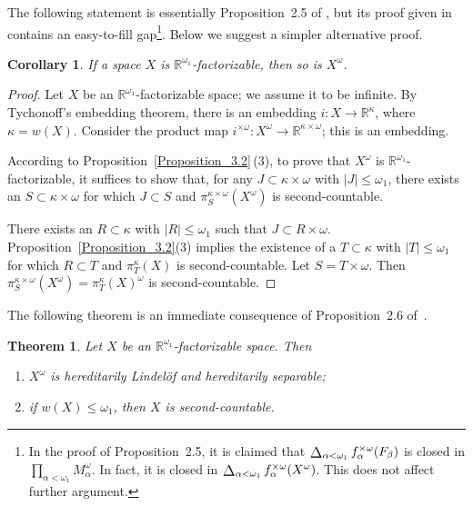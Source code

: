 \documentclass[a4paper,12pt]{amsart}
\newtheorem{theorem}{Theorem}[section]
\newtheorem{corollary}{Corollary}[section]
\theoremstyle{definition}
\theoremstyle{remark}
\def\bigdiag{\operatornamewithlimits{%
  \mathchoice{\vcenter{\hbox{\Large$\Delta$}}}
             {\vcenter{\hbox{\large$\Delta$}}}
             {\Delta}
             {\Delta}}}
\begin{document}
The following statement is essentially Proposition~2.5 of \cite{R-S_2025}, but its proof given in 
\cite{R-S_2025} contains an easy-to-fill gap\footnote{In the proof of Proposition~2.5, it is claimed that 
$\bigdiag_{\alpha<\omega_1}f_\alpha^{\times\omega}(F_\beta)$ is closed in 
$\prod_{\alpha<\omega_1}M_\alpha^\omega$. In fact, 
it is closed in $\bigdiag_{\alpha<\omega_1}f_\alpha^{\times\omega}(X^\omega)$. 
This does not affect further argument.}. Below we 
suggest a simpler alternative proof. 

\begin{corollary}
\label{Corollary_3.1}
If a space $X$ is $\mathbb R^{\omega_1}$-factorizable, then so is $X^\omega$.
\end{corollary}

\begin{proof}
Let $X$ be an $\mathbb R^{\omega_1}$-factorizable space; we assume it to be infinite. 
By Tychonoff's embedding theorem, 
there is an embedding $i\colon X\to \mathbb R^\kappa$, where $\kappa=w(X)$. Consider the product map 
$i^{\times \omega}\colon X^\omega\to \mathbb R^{\kappa\times\omega}$; this is an embedding. 

According to Proposition~\ref{Proposition_3.2}\,(3), to prove that $X^\omega$ is 
$\mathbb R^{\omega_1}$-factorizable, it suffices to show that, for any $J\subset \kappa\times \omega$ with 
$|J|\le \omega_1$, there exists an $S\subset \kappa\times \omega$ for which $J\subset S$ and 
$\pi_S^{\kappa\times \omega}(X^\omega)$ is second-countable.

There exists an $R\subset \kappa$ with $|R|\leq\omega_1$ such that $J\subset R\times \omega$.
Proposition~\ref{Proposition_3.2}(3) implies the existence of a $T\subset \kappa$ with $|T|\leq\omega_1$ 
for which $R\subset T$ and $\pi_T^\kappa(X)$ is second-countable.
Let $S=T\times \omega$. Then $\pi_S^{\kappa\times \omega}(X^\omega)=\pi_T^\kappa(X)^\omega$ is second-countable.
\end{proof}

The following theorem is an immediate consequence of Proposition~2.6 of~\cite{R-S_2025}.

\begin{theorem}
\label{Theorem_3.2}
Let $X$ be an $\mathbb R^{\omega_1}$-factorizable space. Then
\begin{enumerate}
\item[\rm(1)]
$X^\omega$ is hereditarily Lindel\"of and hereditarily separable; 
\item[\rm(2)]
if $w(X)\leq\omega_1$, then $X$ is second-countable.
\end{enumerate}
\end{theorem}
\end{document}
